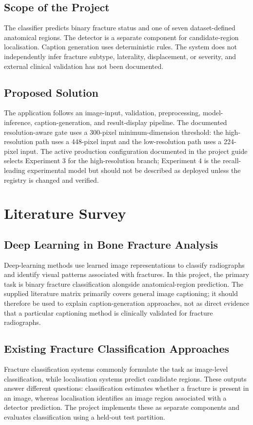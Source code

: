 \documentclass{article}
\begin{document}
\subsection{Scope of the Project}
The classifier predicts binary fracture status and one of seven dataset-defined anatomical regions. The detector is a separate component for candidate-region localisation. Caption generation uses deterministic rules. The system does not independently infer fracture subtype, laterality, displacement, or severity, and external clinical validation has not been documented.

\subsection{Proposed Solution}
The application follows an image-input, validation, preprocessing, model-inference, caption-generation, and result-display pipeline. The documented resolution-aware gate uses a 300-pixel minimum-dimension threshold: the high-resolution path uses a 448-pixel input and the low-resolution path uses a 224-pixel input. The active production configuration documented in the project guide selects Experiment 3 for the high-resolution branch; Experiment 4 is the recall-leading experimental model but should not be described as deployed unless the registry is changed and verified.

\section{Literature Survey}

\subsection{Deep Learning in Bone Fracture Analysis}
Deep-learning methods use learned image representations to classify radiographs and identify visual patterns associated with fractures. In this project, the primary task is binary fracture classification alongside anatomical-region prediction. The supplied literature matrix primarily covers general image captioning; it should therefore be used to explain caption-generation approaches, not as direct evidence that a particular captioning method is clinically validated for fracture radiographs.

\subsection{Existing Fracture Classification Approaches}
Fracture classification systems commonly formulate the task as image-level classification, while localisation systems predict candidate regions. These outputs answer different questions: classification estimates whether a fracture is present in an image, whereas localisation identifies an image region associated with a detector prediction. The project implements these as separate components and evaluates classification using a held-out test partition.
\end{document}
